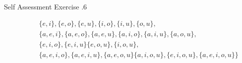 \documentclass[../notes.tex]{subfiles}
\begin{document}
\begin{exercise}{Self Assessment Exercise \thechapter.6}
\begin{enumerate}
\begin{enumerate}[label=(\alph*)]
\begin{align*}
                  & \qquad \{e, i\}, \{e, o\}, \{e, u\}, \{i, o\}, \{i, u\}, \{o, u\},\\
                  & \qquad \{a, e, i\}, \{a, e, o\}, \{a, e, u\}, \{a, i, o\}, \{a, i, u\}, \{a, o, u\},\\
                  & \qquad \{e, i, o\}, \{e, i, u\} \{e, o, u\}, \{i, o, u\},\\
                  & \qquad \{a, e, i, o\}, \{a, e, i, u\}, \{a, e, o, u\} \{a, i, o, u\}, \{e, i, o, u\}, \{a, e, i, o, u\}\bigr\}
                \end{align*}
            \end{enumerate}
        \end{enumerate}
      \end{exercise}
\end{document}
